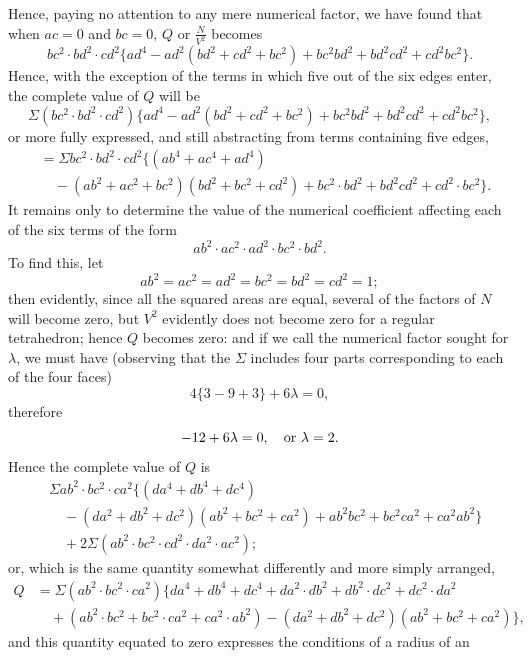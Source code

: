 \documentclass[11pt]{article}
\newcommand{\sourcepage}[1]{\marginpar{\scriptsize p.~#1}}
\begin{document}
{{\sourcepage{408}
Hence, paying no attention to any mere numerical factor, we have found that when $ac=0$ and $bc=0$, $Q$ or $\frac{N}{V^2}$ becomes
\[
bc^2\cdot bd^2\cdot cd^2\{ad^4-ad^2(bd^2+cd^2+bc^2)+bc^2bd^2+bd^2cd^2+cd^2bc^2\}.
\]
Hence, with the exception of the terms in which five out of the six edges enter, the complete value of $Q$ will be
\[
\Sigma(bc^2\cdot bd^2\cdot cd^2)\{ad^4-ad^2(bd^2+cd^2+bc^2)+bc^2bd^2+bd^2cd^2+cd^2bc^2\},
\]
or more fully expressed, and still abstracting from terms containing five edges,
\[
\begin{aligned}
&=\Sigma bc^2\cdot bd^2\cdot cd^2\{(ab^4+ac^4+ad^4)\\
&\quad -(ab^2+ac^2+bc^2)(bd^2+bc^2+cd^2)
+bc^2\cdot bd^2+bd^2cd^2+cd^2\cdot bc^2\}.
\end{aligned}
\]
It remains only to determine the value of the numerical coefficient affecting each of the six terms of the form
\[
ab^2\cdot ac^2\cdot ad^2\cdot bc^2\cdot bd^2.
\]
To find this, let
\[
ab^2=ac^2=ad^2=bc^2=bd^2=cd^2=1;
\]
then evidently, since all the squared areas are equal, several of the factors of $N$ will become zero, but $V^2$ evidently does not become zero for a regular tetrahedron; hence $Q$ becomes zero: and if we call the numerical factor sought for $\lambda$, we must have (observing that the $\Sigma$ includes four parts corresponding to each of the four faces)
\[
4\{3-9+3\}+6\lambda=0,
\]
therefore
\[
-12+6\lambda=0,\quad \hbox{or }\lambda=2.
\]
Hence the complete value of $Q$ is
\[
\begin{aligned}
&\Sigma ab^2\cdot bc^2\cdot ca^2\{(da^4+db^4+dc^4)\\
&\quad -(da^2+db^2+dc^2)(ab^2+bc^2+ca^2)
+ab^2bc^2+bc^2ca^2+ca^2ab^2\}\\
&\quad +2\Sigma(ab^2\cdot bc^2\cdot cd^2\cdot da^2\cdot ac^2);
\end{aligned}
\]
or, which is the same quantity somewhat differently and more simply arranged,
\[
\begin{aligned}
Q&=\Sigma(ab^2\cdot bc^2\cdot ca^2)\{da^4+db^4+dc^4+da^2\cdot db^2+db^2\cdot dc^2+dc^2\cdot da^2\\
&\quad +(ab^2\cdot bc^2+bc^2\cdot ca^2+ca^2\cdot ab^2)
-(da^2+db^2+dc^2)(ab^2+bc^2+ca^2)\},
\end{aligned}
\]
and this quantity equated to zero expresses the conditions of a radius of an

}}
\end{document}
